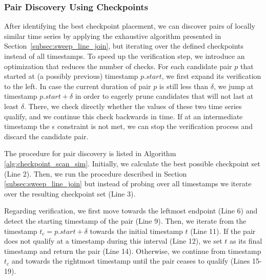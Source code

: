 \subsubsection{Pair Discovery Using Checkpoints}
\label{subsec:checkpoint_join_join}
After identifying the best checkpoint placement, we can discover pairs of locally similar time series by applying the exhaustive algorithm presented in Section~\ref{subsec:sweep_line_join}, but iterating over the defined checkpoints instead of all timestamps. To speed up the verification step, we introduce an optimization that reduces the number of checks. For each candidate pair $p$ that started at (a possibly previous) timestamp $p.start$, we first expand its verification to the left. In case the current duration of pair $p$ is still less than $\delta$, we jump at timestamp $p.start + \delta$ in order to eagerly prune candidates that will not last at least $\delta$. There, we check directly whether the values of these two time series qualify, and we continue this check backwards in time. If at an intermediate timestamp the $\epsilon$ constraint is not met, we can stop the verification process and discard the candidate pair.

The procedure for pair discovery is listed in Algorithm \ref{alg:checkpoint_scan_sim}. Initially, we calculate the best possible checkpoint set (Line 2). Then, we run the procedure described in Section \ref{subsec:sweep_line_join} but instead of probing over all timestamps we iterate over the resulting checkpoint set (Line 3).

Regarding verification, we first move towards the leftmost endpoint (Line 6) and detect the starting timestamp of the pair (Line 9). Then, we iterate from the timestamp $t_c = p.start + \delta$ towards the initial timestamp $t$ (Line 11). If the pair does not qualify at a timestamp during this interval (Line 12), we set $t$ as its final timestamp and return the pair (Line 14). Otherwise, we continue from timestamp $t_c$ and towards the rightmost timestamp until the pair ceases to qualify (Lines 15-19).

